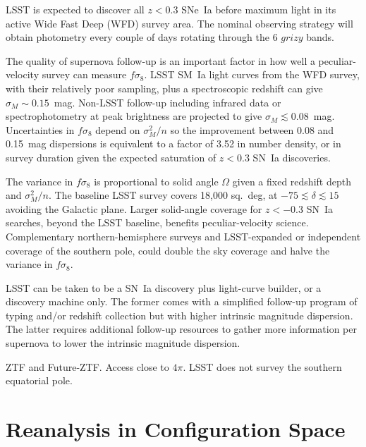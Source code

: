 \documentclass{aastex62}   	%
\begin{document}
LSST is expected to discover all $z<0.3$ SNe~Ia before maximum light in its active Wide Fast Deep (WFD) survey area.
The nominal observing strategy will obtain photometry every couple of days rotating through the 6 $grizy$ bands.

The quality of supernova follow-up is an important factor in how well a peculiar-velocity survey can measure $f\sigma_8$.
LSST SM~Ia light curves from the WFD survey, with their relatively poor sampling, plus a spectroscopic redshift
 can give $\sigma_M \sim 0.15$~mag. Non-LSST follow-up including infrared data \citep{2012MNRAS.425.1007B} or spectrophotometry at peak brightness
 \citep{2015ApJ...815...58F} are projected to give
$\sigma_M \lesssim 0.08$~mag.
Uncertainties in $f\sigma_8$ depend on $\sigma^2_M/n$ so the improvement between 0.08 and 0.15~mag dispersions is equivalent to a factor of 3.52
 in number density, or in survey duration given the expected saturation of $z<0.3$ SN~Ia discoveries.

The variance in $f\sigma_8$ is proportional to solid angle $\Omega$ given a fixed redshift depth and  $\sigma^2_M/n$.  The baseline
LSST survey covers 18,000 sq.~deg, at $-75 \lesssim \delta \lesssim15$ avoiding the Galactic plane.  Larger solid-angle coverage for $z<-0.3$ SN~Ia searches, beyond
the LSST baseline, benefits peculiar-velocity science.  Complementary northern-hemisphere surveys and LSST-expanded or independent
coverage of the southern pole, could double
the sky coverage and halve the variance in $f\sigma_8$.

LSST can be taken to be a SN~Ia discovery plus light-curve builder, or a discovery machine only.  The former comes with a simplified follow-up program of typing
and/or redshift collection but with higher intrinsic magnitude dispersion.  The latter requires additional follow-up resources to gather more information per supernova to
lower the intrinsic magnitude dispersion.

ZTF and Future-ZTF.  Access close to $4\pi$.  LSST does not survey the southern equatorial pole.

\appendix
\section{Reanalysis in Configuration Space}
\end{document}
